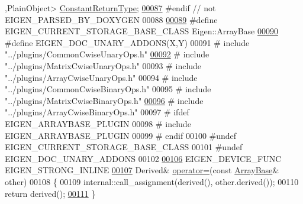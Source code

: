\begin{DoxyCode}
      ,PlainObject> \hyperlink{group___core___module_class_eigen_1_1_cwise_nullary_op}{ConstantReturnType};
\hyperlink{group___core___module_a3c09942b87b89c06dc204fe8cf514ade}{00087} \textcolor{preprocessor}{#endif // not EIGEN\_PARSED\_BY\_DOXYGEN}
00088 
\hyperlink{group___core___module_a7b262ecb3e4db0f87d2eae85f2d64f15}{00089} \textcolor{preprocessor}{#define EIGEN\_CURRENT\_STORAGE\_BASE\_CLASS Eigen::ArrayBase}
\hyperlink{group___core___module_ad849f92841311f48355283164344c753}{00090} \textcolor{preprocessor}{#define EIGEN\_DOC\_UNARY\_ADDONS(X,Y)}
00091 \textcolor{preprocessor}{#   include "../plugins/CommonCwiseUnaryOps.h"}
\hyperlink{group___core___module_ae88791088470f8e33e903e9a46b02804}{00092} \textcolor{preprocessor}{#   include "../plugins/MatrixCwiseUnaryOps.h"}
00093 \textcolor{preprocessor}{#   include "../plugins/ArrayCwiseUnaryOps.h"}
00094 \textcolor{preprocessor}{#   include "../plugins/CommonCwiseBinaryOps.h"}
00095 \textcolor{preprocessor}{#   include "../plugins/MatrixCwiseBinaryOps.h"}
\hyperlink{group___core___module_ac0e2019654b0bf1e82ada75b3ea9e5ef}{00096} \textcolor{preprocessor}{#   include "../plugins/ArrayCwiseBinaryOps.h"}
00097 \textcolor{preprocessor}{#   ifdef EIGEN\_ARRAYBASE\_PLUGIN}
00098 \textcolor{preprocessor}{#     include EIGEN\_ARRAYBASE\_PLUGIN}
00099 \textcolor{preprocessor}{#   endif}
00100 \textcolor{preprocessor}{#undef EIGEN\_CURRENT\_STORAGE\_BASE\_CLASS}
00101 \textcolor{preprocessor}{#undef EIGEN\_DOC\_UNARY\_ADDONS}
00102 
\hyperlink{group___core___module_a7748ba1f6891fa4e10723a8bf77b8770}{00106}     EIGEN\_DEVICE\_FUNC EIGEN\_STRONG\_INLINE
\hyperlink{group___core___module_a72f5fe3d0805810e65eb897ccd3b6760}{00107}     Derived& \hyperlink{group___core___module_a72f5fe3d0805810e65eb897ccd3b6760}{operator=}(\textcolor{keyword}{const} \hyperlink{group___core___module_class_eigen_1_1_array_base}{ArrayBase}& other)
00108     \{
00109       internal::call\_assignment(derived(), other.derived());
00110       \textcolor{keywordflow}{return} derived();
\hyperlink{group___core___module_a7c2e31673c2243b135e13de05de6e636}{00111}     \}

\end{DoxyCode}
